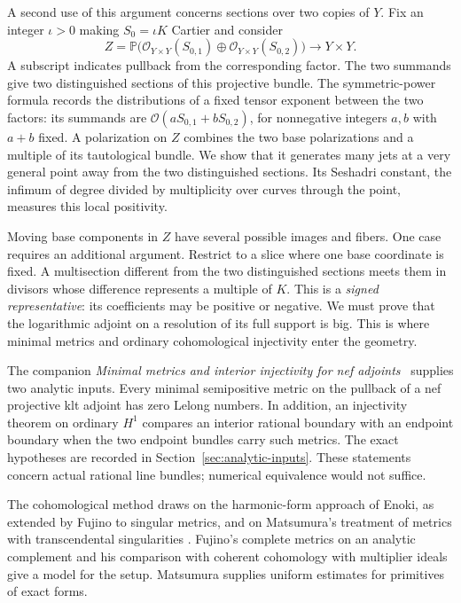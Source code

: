 A second use of this argument concerns sections over two copies of $Y$.
Fix an integer $\iota>0$ making $S_0=\iota K$ Cartier and consider
\[
 Z=\mathbb P\bigl(\mathcal O_{Y\times Y}(S_{0,1})
             \oplus\mathcal O_{Y\times Y}(S_{0,2})\bigr)
       \longrightarrow Y\times Y.
\]
A subscript indicates pullback from the corresponding factor. The two
summands give two distinguished sections of this projective bundle.
The symmetric-power formula records the distributions of a fixed
tensor exponent between the two factors: its summands are
$\mathcal O(aS_{0,1}+bS_{0,2})$, for nonnegative integers $a,b$
with $a+b$ fixed.
A polarization on $Z$ combines the two base polarizations and a multiple
of its tautological bundle. We show that it generates many jets at a
very general point away from the two distinguished sections. Its
Seshadri constant, the infimum of degree divided by multiplicity over
curves through the point, measures this local positivity.

Moving base components in $Z$ have several possible images and fibers.
One case requires an additional argument. Restrict to a slice where one
base coordinate is fixed. A multisection different from the two
distinguished sections meets them in divisors whose difference represents
a multiple of $K$. This is a \emph{signed representative}: its coefficients
may be positive or negative. We must prove that the logarithmic adjoint
on a resolution of its full support is big. This is where minimal metrics
and ordinary cohomological injectivity enter the geometry.

The companion \emph{Minimal metrics and interior injectivity
for nef adjoints}~\cite{OpenAIMetrics2026} supplies two analytic inputs. Every minimal semipositive metric on
the pullback of a nef projective klt adjoint has zero Lelong numbers.
In addition, an injectivity theorem on ordinary $H^1$ compares an
interior rational boundary with an endpoint boundary when the two endpoint
bundles carry such metrics. The exact hypotheses are recorded in
Section~\ref{sec:analytic-inputs}. These statements concern actual rational
line bundles; numerical equivalence would not suffice.

The cohomological method draws on the harmonic-form approach of Enoki,
as extended by Fujino to singular metrics, and on Matsumura's treatment
of metrics with transcendental singularities
\cite[Theorem~1.2, Lemmas~3.1--3.2, and Section~3, Claim~1]{FujinoInjectivity2012}
\cite[Theorems~1.3 and~5.9, Sections~5.2--5.3]{Matsumura2018}.
Fujino's complete metrics on an analytic complement and his comparison
with coherent cohomology with multiplier ideals give a model for the
setup. Matsumura supplies uniform estimates for primitives of exact forms.

